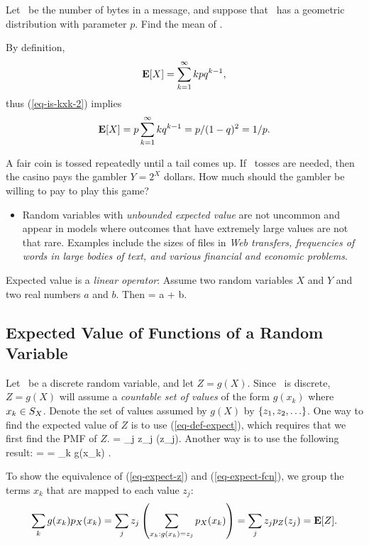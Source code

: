	\item {}
	Let \X\ be the number of bytes in a message,
	and suppose that \X\ has a geometric distribution with parameter $p$.
	Find the mean of \X.

	By definition,
	\[
		{\bf E}[X] = \sum_{k=1}^{\infty} k p q^{k-1},
	\]
	thus (\ref{eq-is-kxk-2}) implies
	\[
		{\bf E}[X] = p \sum_{k=1}^{\infty} k q^{k-1} = p/(1-q)^2 = 1/p.
	\]

	\item {}
	A fair coin is tossed repeatedly until a tail comes up.
	If \X\ tosses are needed,
	then the casino pays the gambler $Y = 2^X$
	dollars.
	How much should the gambler be willing to pay to play this game?

	\begin{itemize}
		\item Random variables with \emph{unbounded expected value}
		are not uncommon and appear in models where outcomes that have extremely large values
		are not that rare.
		Examples include the sizes of files in
		\emph{Web transfers, frequencies of words in large bodies of text,
		and various financial and economic problems}.
	\end{itemize}

	\item Expected value is a \emph{linear operator}:
	Assume two random variables $X$ and $Y$
	and two real numbers $a$ and $b$. Then
		 = a + b.
	\eeql

\eit

\subsection{Expected Value of Functions of a Random Variable}
\bit
	\item Let \X\ be a discrete random variable,
	and let $Z = g(X)$.
	Since \X\ is discrete,
	$Z = g(X)$ will assume a \emph{countable set of values}
	of the form $g(x_k)$ where $x_k \in S_X$.
	Denote the set of values assumed by $g(X)$
	by $\{{z}_1, {z}_2, \ldots \}$.
	One way to find the expected value of $Z$
	is to use (\ref{eq-def-expect}),
	which requires that we first find the PMF of $Z$.
		 = \sum_j z_j (z_j).
	\eeql
	Another way is to use the following result:
		 =  = \sum_k g(x_k) .
	\eeql

	To show the equivalence of (\ref{eq-expect-z}) and (\ref{eq-expect-fcn}),
	we group the terms $x_k$ that are mapped to each value $z_j$:
	\[
		\sum_k g(x_k) p_{X}(x_k)
		=  \sum_j z_j \left( \sum_{x_k:g(x_k)=z_j} p_{X}(x_k) \right)
		= \sum_j z_j p_{Z}(z_j) = {\bf E}[Z].
	\]

